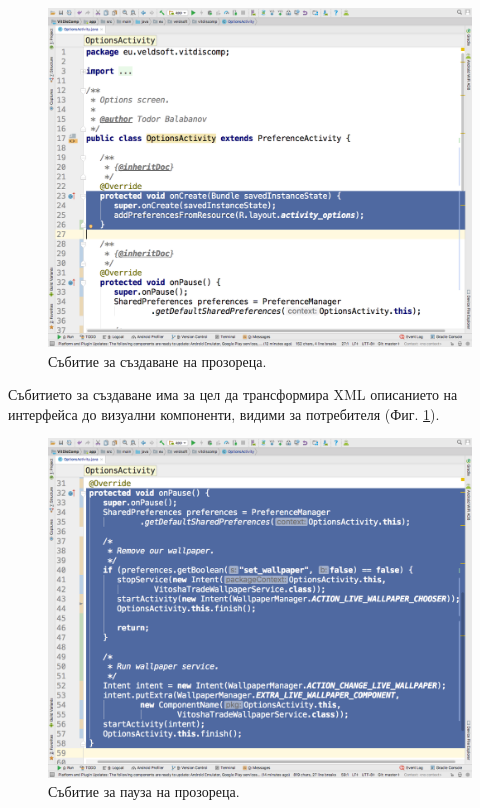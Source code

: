 \documentclass[book,14pt,oneside,openany]{memoir}
\begin{document}
\begin{figure}[h]
  \centering
  \includegraphics[height=0.45\pdfpageheight]{pic0028}
  \caption{Събитие за създаване на прозореца.}
\label{fig:pic0028}
\end{figure}
\FloatBarrier

Събитието за създаване има за цел да трансформира XML описанието на интерфейса до визуални компоненти, видими за потребителя (Фиг. \ref{fig:pic0028}). 

\begin{figure}[h]
  \centering
  \includegraphics[height=0.45\pdfpageheight]{pic0029}
  \caption{Събитие за пауза на прозореца.}
\label{fig:pic0029}
\end{figure}
\FloatBarrier
\end{document}
